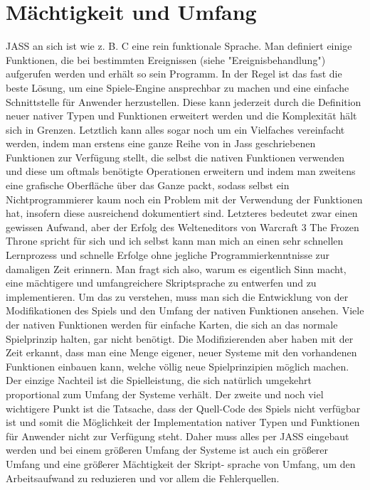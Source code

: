 \section{Mächtigkeit und Umfang}
JASS an sich ist wie z. B. C eine rein funktionale Sprache. Man definiert einige Funktionen, die bei bestimmten Ereignissen (siehe "Ereignisbehandlung")
aufgerufen werden und erhält so sein Programm. In der Regel ist das fast die beste Lösung, um eine Spiele-Engine ansprechbar zu machen und eine einfache
Schnittstelle für Anwender herzustellen. Diese kann jederzeit durch die Definition neuer nativer Typen und Funktionen erweitert werden und die Komplexität
hält sich in Grenzen. Letztlich kann alles sogar noch um ein Vielfaches vereinfacht werden, indem man erstens eine ganze Reihe von in Jass geschriebenen
Funktionen zur Verfügung stellt, die selbst die nativen Funktionen verwenden und diese um oftmals benötigte Operationen erweitern und indem man zweitens
eine grafische Oberfläche über das Ganze packt, sodass selbst ein Nichtprogrammierer kaum noch ein Problem mit der Verwendung der Funktionen hat, insofern
diese ausreichend dokumentiert sind.
Letzteres bedeutet zwar einen gewissen Aufwand, aber der Erfolg des Welteneditors von Warcraft 3 The Frozen Throne spricht für sich und ich selbst kann
man mich an einen sehr schnellen Lernprozess und schnelle Erfolge ohne jegliche Programmierkenntnisse zur damaligen Zeit erinnern.
Man fragt sich also, warum es eigentlich Sinn macht, eine mächtigere und umfangreichere Skriptsprache zu entwerfen und zu implementieren.
Um das zu verstehen, muss man sich die Entwicklung von der Modifikationen des Spiels und den Umfang der nativen Funktionen ansehen.
Viele der nativen Funktionen werden für einfache Karten, die sich an das normale Spielprinzip halten, gar nicht benötigt. Die Modifizierenden aber haben
mit der Zeit erkannt, dass man eine Menge eigener, neuer Systeme mit den vorhandenen Funktionen einbauen kann, welche völlig neue Spielprinzipien möglich machen.
Der einzige Nachteil ist die Spielleistung, die sich natürlich umgekehrt proportional zum Umfang der Systeme verhält.
Der zweite und noch viel wichtigere Punkt ist die Tatsache, dass der Quell-Code des Spiels nicht verfügbar ist und somit die Möglichkeit der Implementation
nativer Typen und Funktionen für Anwender nicht zur Verfügung steht.
Daher muss alles per JASS eingebaut werden und bei einem größeren Umfang der Systeme ist auch ein größerer Umfang und eine größerer Mächtigkeit der Skript-
sprache von Umfang, um den Arbeitsaufwand zu reduzieren und vor allem die Fehlerquellen.

